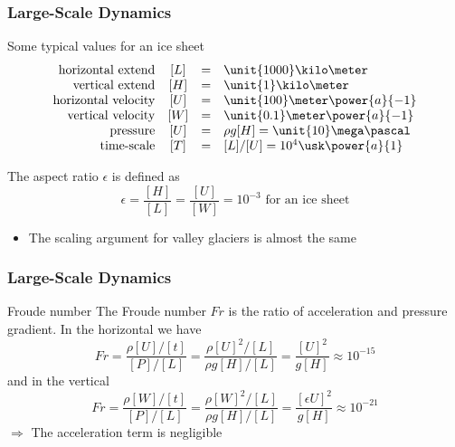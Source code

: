 \documentclass[hide notes,intlimits]{beamer}
\begin{document}
\begin{frame}
  \frametitle{Large-Scale Dynamics}
  \begin{block}{Some typical values for an ice sheet}
  \begin{equation*}
  \begin{array}{rccl}
    \text{horizontal extend} &  [L] & = & \unit{1000}\kilo\meter\\
    \text{vertical extend} & [H] & = & \unit{1}\kilo\meter \\
    \text{horizontal velocity} & [U] & = & \unit{100}\meter\power{a}{-1}\\
    \text{vertical velocity} & [W] & = & \unit{0.1}\meter\power{a}{-1}\\
    \text{pressure} & [U] & = & \rho g[H] = \unit{10}\mega\pascal\\
    \text{time-scale} & [T] & = &[L]/[U] = 10^{4}\usk\power{a}{1}\\
  \end{array}
  \end{equation*}
  \end{block}
  The aspect ratio $\epsilon$ is defined as
  \begin{equation*}
    \epsilon = \frac{[H]}{[L]} = \frac{[U]}{[W]} = 10^{-3} \text{ for an ice sheet}
  \end{equation*}
  \begin{itemize}
    \item The scaling argument for valley glaciers is almost the same
   \end{itemize}
\end{frame}


\begin{frame}
  \frametitle{Large-Scale Dynamics}
  \begin{block}{Froude number}
    The \alert{Froude number $Fr$} is the ratio of acceleration and pressure gradient. In the horizontal we have
  \begin{equation*}
    Fr = \frac{\rho[U]/[t]}{[P]/[L]} = \frac{\rho[U]^{2}/[L]}{\rho g [H]/[L]} = \frac{[U]^{2}}{g[H]} \approx 10^{-15}
  \end{equation*}
  and in the vertical
  \begin{equation*}
    Fr = \frac{\rho[W]/[t]}{[P]/[L]} = \frac{\rho[W]^{2}/[L]}{\rho g [H]/[L]} = \frac{[\epsilon U]^{2}}{g[H]} \approx 10^{-21}
  \end{equation*}
  $\Rightarrow$ The \alert{acceleration term} is \alert{negligible}
  \end{block}
\end{frame}
\end{document}
